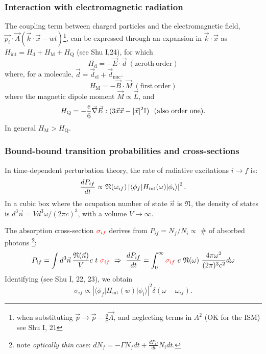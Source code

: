  \begin{frame}\frametitle{ Interaction with electromagnetic radiation}




The coupling term between charged particles and the electromagnetic
field,
$\vec{p_i}\cdot\vec{A}(\vec{k}\cdot\vec{x}-wt)$\footnote{when
substituting 
$\vec{p} \rightarrow \vec{p}-\frac{q}{c}\vec{A}$, and neglecting terms
in  $A^2$ (OK for the ISM) see Shu I, 21}, can be expressed 
through an expansion in $\vec{k}\cdot\vec{x}$ as $H_\mathrm{int}
= H_\mathrm{d} + H_\mathrm{M} + H_\mathrm{Q}$ (see Shu I,24), for which
\[ H_\mathrm{d} = - \vec{E}\cdot\vec{d} ~ (\mathrm{zeroth~order})\]
where, for a molecule,  $\vec{d} = \vec{d}_\mathrm{el} + \vec{d}_\mathrm{nuc}$.
\[ H_\mathrm{M} = - \vec{B}\cdot\vec{M} ~  (\mathrm{first~order}) \]
where the magnetic dipole moment $\vec{M} \propto \vec{L} $, and
\[ H_\mathrm{Q} = - \frac{e}{6}\vec{\nabla}\vec{E}:(3 \vec{x}\vec{x} -
|\vec{x}|^2 {\Bbb I})  ~~  (\mathrm{also ~order~one}).  \]
In general  $H_\mathrm{M} >  H_\mathrm{Q}$. 



\end{frame} \begin{frame}\frametitle{Bound-bound
transition probabilities and cross-sections}

In time-dependent perturbation theory, the rate of radiative
excitations $i \rightarrow f$ is:
\[ \frac{dP_{if}}{dt} \propto    {\frak N}(\omega_{if})    \left| \langle \phi_f| H_\mathrm{int}(\omega) |\phi_i \rangle \right|^2. \] 
In a cubic box where the ocupation number of state 
$\vec{n}$ is ${\frak N}$, the density of states is $d^3\vec{n} = V
d^3\omega / (2\pi c )^3$, with a volume $V \rightarrow \infty $.

The absorption cross-section $\textcolor{red}{\sigma_{if}}$ derives
from $ P_{if} = N_f/N_i \propto $ \# of absorbed photons
\footnote{note   {\em optically thin} case: $dN_f = -\Gamma N_f dt + \frac{d P_{if}} {dt} N_i dt $.}: 
\[ P_{if} = \int d^3\vec{n} \, \frac {{\frak N}(\vec{n})} {V}   c~ t~  \textcolor{red}{\sigma_{if}}  ~ \Rightarrow  ~  \frac{dP_{if}}{dt} = \int_0^\infty \textcolor{red}{\sigma_{if}}~ c~ {\frak N}(\omega) ~\frac{4 \pi \omega^2}{(2\pi)^3 c^2} d\omega\]
Identifying (see Shu I, 22, 23), we obtain
\[ \sigma_{if} \propto    \left|  \langle \phi_f| H_\mathrm{int}(w) |\phi_i \rangle \right|^2   \delta(\omega-\omega_{if}).  \]



\end{frame}
